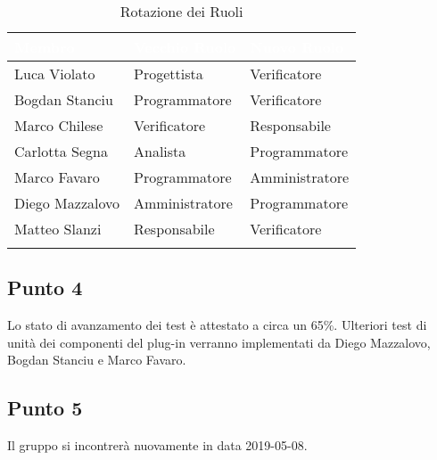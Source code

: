 \begin{center}
	\begin{longtable}[c]{|m{}|m{}|m{}|} 
		\hline
		\rowcolor{bluelogo}\textbf{\textcolor{white}{Membro}} & \textbf{\textcolor{white}{Vecchio Ruolo}} & \textbf{\textcolor{white}{Nuovo Ruolo}}\\
		\hline
		\hline
		Luca Violato & Progettista & Verificatore \\
		\hline
		\rowcolor{grigio}Bogdan Stanciu & Programmatore & Verificatore \\
		\hline
		Marco Chilese & Verificatore & Responsabile\\
		\hline
		\rowcolor{grigio}Carlotta Segna & Analista & Programmatore\\
		\hline
		Marco Favaro & Programmatore & Amministratore \\
		\hline
		\rowcolor{grigio} Diego Mazzalovo & Amministratore & Programmatore\\
		\hline
		Matteo Slanzi & Responsabile & Verificatore\\
		\hline
		\caption{Rotazione dei Ruoli}
	\end{longtable}

\end{center}

\subsection{Punto 4}
Lo stato di avanzamento dei test è attestato a circa un 65\%. Ulteriori test di unità dei componenti del plug-in verranno implementati da Diego Mazzalovo, Bogdan Stanciu e Marco Favaro.

\subsection{Punto 5}
Il gruppo si incontrerà nuovamente in data 2019-05-08.